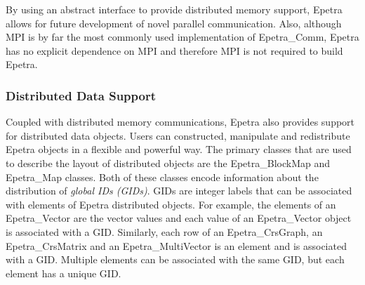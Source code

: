 \documentclass[12pt,relax]{EpetraUserGuide}
\newcommand{\comm}{Epetra\_Comm}
\newcommand{\map}{Epetra\_Map}
\newcommand{\blockmap}{Epetra\_BlockMap}
\renewcommand{\vector}{Epetra\_Vector}
\newcommand{\multivector}{Epetra\_MultiVector}
\newcommand{\crsgraph}{Epetra\_CrsGraph}
\newcommand{\crsmatrix}{Epetra\_CrsMatrix}
\begin{document}
By using an abstract interface to provide distributed memory support,
Epetra allows for future development of novel parallel communication.
Also, although MPI is by far the most commonly used implementation of
\comm{}, Epetra has no explicit dependence on MPI and therefore MPI is
not required to build Epetra.

\subsubsection{Distributed Data Support}

Coupled with distributed memory communications, Epetra also provides
support for distributed data objects.  Users can constructed,
manipulate and redistribute Epetra objects in a flexible and powerful
way.  The primary classes that are used to describe the layout of
distributed objects are the \blockmap{} and \map{} classes.  Both of
these classes encode information about the distribution of {\it global
IDs (GIDs)}. GIDs are integer labels that can be associated
with elements of  Epetra distributed objects.  For example, the
elements of an \vector{} are the vector values and each
value of an \vector{} object is associated with a GID.
Similarly, each row of an \crsgraph{}, an \crsmatrix{} and an
\multivector{} is an element and is associated with a GID.  Multiple
elements can be associated with the same GID, but each element has a
unique GID.
\end{document}

